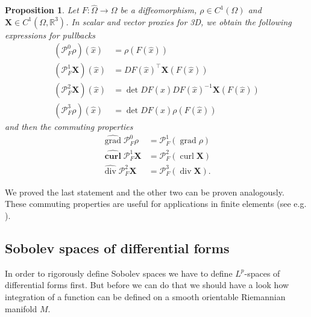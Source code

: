 \documentclass[12pt,a4paper]{article}
\numberwithin{equation}{subsection}
\numberwithin{lemma}{subsection}
\newtheorem{proposition}[lemma]{Proposition}
\theoremstyle{definition}
\DeclareMathOperator{\curl}{curl}
\DeclareMathOperator{\diver}{div}
\DeclareMathOperator{\grad}{grad}
\newcommand{\real}{\mathbb{R}}
\begin{document}
\begin{proposition}
    Let $F: \hat{\Omega} \rightarrow \Omega$ be a diffeomorphism, 
    $\rho \in C^1(\Omega)$ and $\mathbf{X} \in C^1(\Omega, \real^3)$.
    In scalar and vector proxies for 3D, we obtain the following expressions for 
    pullbacks
    \begin{align*}
        (\mathcal{P}^0_F \rho)(\hat{x}) &= \rho(F(\hat{x}))
        \\ (\mathcal{P}^1_F \mathbf{X})(\hat{x}) &= DF(\hat{x})^\top \mathbf{X}(F(\hat{x}))
        \\ (\mathcal{P}^2_F \mathbf{X})(\hat{x}) &= \det DF(\hat{x}) DF(\hat{x})^{-1} \mathbf{X}(F(\hat{x}))
        \\ (\mathcal{P}^3_F \rho)(\hat{x}) &= \det DF(\hat{x}) \rho(F(\hat{x}))
    \end{align*}
    and then the commuting properties
    \begin{align*}
        \widehat{\grad} \mathcal{P}^0_F \rho &= \mathcal{P}^1_F (\grad \rho)
        \\ \widehat{\mathbf{\curl}} \mathcal{P}^1_F \mathbf{X} &= \mathcal{P}^2_F (\curl \mathbf{X})
        \\ \widehat{\diver} \mathcal{P}^2_F \mathbf{X} &= \mathcal{P}^3_F (\diver \mathbf{X}).
    \end{align*}
\end{proposition}
We proved the last statement and the other two can be proven analogously. 
These commuting properties are useful for applications in finite elements
(see e.g. \cite[Sec.\,14.3]{ern_guermond}).





\subsection{Sobolev spaces of differential forms}

In order to rigorously define Sobolev spaces we have to define $L^p$-spaces 
of differential forms first. But before we can do that we should have a look
how integration of a function can be defined on a smooth orientable 
Riemannian manifold $M$. 
\end{document}

